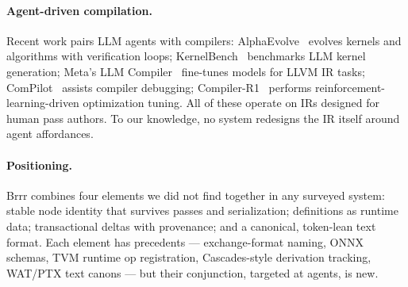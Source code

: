 \paragraph{Agent-driven compilation.} Recent work pairs LLM agents with compilers:
AlphaEvolve~\cite{alphaevolve} evolves kernels and algorithms with verification
loops; KernelBench~\cite{kernelbench} benchmarks LLM kernel generation; Meta's LLM
Compiler~\cite{llmcompiler} fine-tunes models for LLVM IR tasks;
ComPilot~\cite{compilot} assists compiler debugging; Compiler-R1~\cite{compilerr1}
performs reinforcement-learning-driven optimization tuning. All of these operate on
IRs designed for human pass authors. To our knowledge, no system redesigns the IR
itself around agent affordances.

\paragraph{Positioning.} Brrr combines four elements we did not find together in
any surveyed system: stable node identity that survives passes and serialization;
definitions as runtime data; transactional deltas with provenance; and a canonical,
token-lean text format. Each element has precedents — exchange-format naming, ONNX
schemas, TVM runtime op registration, Cascades-style derivation tracking, WAT/PTX
text canons — but their conjunction, targeted at agents, is new.
